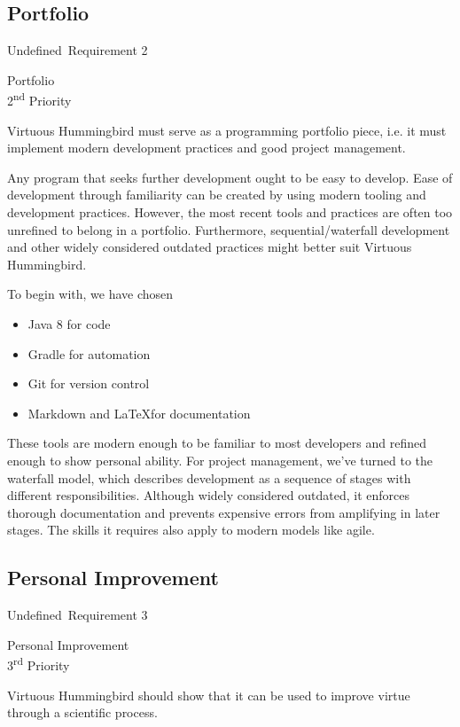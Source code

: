 \documentclass{article}
\newcommand{\requirementname}{Undefined}
\newcommand{\requirementlabel}{undefined}
\newenvironment{requirement}[2][]
    {
        \begin{mdframed}
        \label{\requirementlabel-#2}
        \vspace{2.5mm}
        \begin{center}
            {
                \large
                \requirementname\ Requirement #2
            
                #1
            }
        \end{center}
        \vspace{2.5mm}
    }
    {
        \end{mdframed}
    }
\begin{document}
\subsection{Portfolio}

\begin{requirement}[Portfolio \\ 2\textsuperscript{nd} Priority]{2}
    Virtuous Hummingbird must serve as a programming portfolio piece, i.e. it must implement modern development practices and good project management.
\end{requirement}

Any program that seeks further development ought to be easy to develop.
Ease of development through familiarity can be created by using modern tooling and development practices.
However, the most recent tools and practices are often too unrefined to belong in a portfolio.
Furthermore, sequential/waterfall development and other widely considered outdated practices might better suit Virtuous Hummingbird.

To begin with, we have chosen
\begin{itemize}
    \item Java 8 for code
    \item Gradle for automation
    \item Git for version control
    \item Markdown and \LaTeX for documentation
\end{itemize}
These tools are modern enough to be familiar to most developers and refined enough to show personal ability.
For project management, we've turned to the waterfall model, which describes development as a sequence of stages with different responsibilities.
Although widely considered outdated, it enforces thorough documentation and prevents expensive errors from amplifying in later stages.
The skills it requires also apply to modern models like agile.

\subsection{Personal Improvement}

\begin{requirement}[Personal Improvement \\ 3\textsuperscript{rd} Priority]{3}
    Virtuous Hummingbird should show that it can be used to improve virtue through a scientific process.
\end{requirement}
\end{document}
